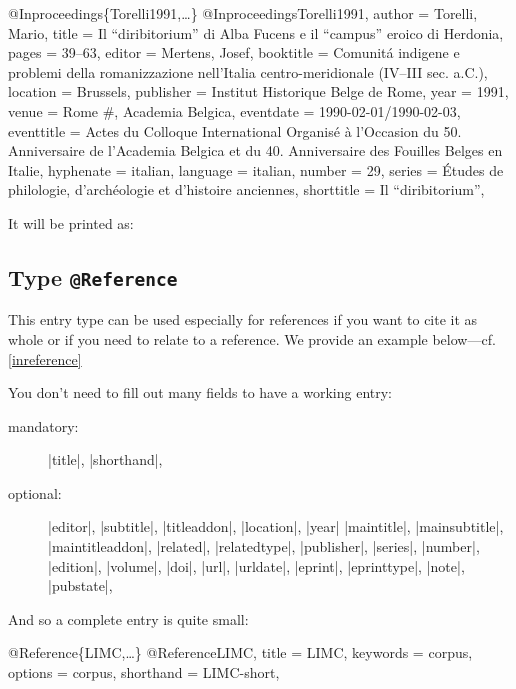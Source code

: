\documentclass[a4paper,
10pt,
greek,
french,
spanish,
italian,
ngerman,
english
]{ltxdoc}
\begin{document}
 
 
 \begin{bibexample}[label=Torelli1991]{{@}Inproceedings\{Torelli1991,…\}}
@Inproceedings{Torelli1991,
  author     = {Torelli, Mario},
  title      = {Il \enquote{diribitorium} di Alba Fucens e il \enquote{campus} eroico di Herdonia},
  pages      = {39--63},
  editor     = {Mertens, Josef},
  booktitle  = {Comunitá indigene e problemi della romanizzazione nell’Italia centro\--meri\-dionale (IV--III sec. a.C.)},
  location   = Brussels,     %
  publisher  = {Institut Historique Belge de Rome},
  year       = {1991},
  venue      = Rome #{, Academia Belgica},    %
  eventdate  = {1990-02-01/1990-02-03},
  eventtitle = {Actes du Colloque International Organisé à l'Occasion du 50. Anniversaire de l'Academia Belgica et du 40. Anniversaire des Fouilles Belges en Italie},
  hyphenate  = {italian},
  language   = {italian},
  number     = {29},
  series     = {Études de philologie, d'archéologie et d'histoire anciennes},
  shorttitle = {Il \enquote{diribitorium}},
}
\end{bibexample}
It will be printed as:
 

 \subsection{Type \texttt{@Reference}}\label{reference}
 This entry type can be used especially for references if you want to cite it as whole or if you need to relate to a reference. 
We provide an example below---cf. \cref{inreference}

You don’t need to fill out many fields to have a working entry:
\begin{description}
\item[mandatory:] |title|, |shorthand|,
\item[optional:] 
 |editor|, |subtitle|, |titleaddon|,
 |location|, |year|
|maintitle|, |mainsubtitle|, |maintitleaddon|,
|related|, |relatedtype|,
|publisher|, |series|, |number|, |edition|, |volume|,
|doi|, |url|, |urldate|, |eprint|, |eprinttype|, |note|, |pubstate|, 
\end{description}

And so a complete entry is quite small:
\begin{bibexample}[label=LIMC]{{@}Reference\{LIMC,…\}}
@Reference{LIMC,
  title     = LIMC,
  keywords  = {corpus},
  options   = {corpus},
  shorthand = LIMC-short,
}
\end{bibexample}
 
\end{document}
